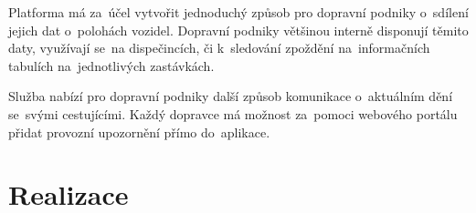 \setlength{\headheight}{15.04742pt}
Platforma má za~účel vytvořit jednoduchý způsob pro dopravní podniky o~sdílení jejich dat o~polohách vozidel. Dopravní podniky většinou interně disponují těmito daty, využívají se~na dispečincích, či k~sledování zpoždění na~informačních tabulích na~jednotlivých zastávkách.\par
Služba nabízí pro dopravní podniky další způsob komunikace o~aktuálním dění se~svými cestujícími. Každý dopravce má možnost za~pomoci webového portálu přidat provozní upozornění přímo do~aplikace.

\chapter{Realizace}



